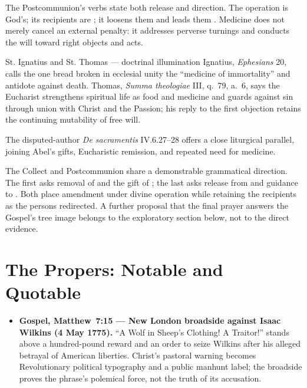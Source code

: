\begin{deepstudy}
The Postcommunion's verbs state both release and direction. The operation is God's; its recipients are ; it loosens them  and leads them . Medicine does not merely cancel an external penalty: it addresses perverse turnings and conducts the will toward right objects and acts.

\begin{sourcecard}{St. Ignatius and St. Thomas --- doctrinal illumination}
Ignatius, \emph{Ephesians} 20, calls the one bread broken in ecclesial unity the ``medicine of immortality'' and antidote against death. Thomas, \emph{Summa theologiae} III, q.~79, a.~6, says the Eucharist strengthens spiritual life as food and medicine and guards against sin through union with Christ and the Passion; his reply to the first objection retains the continuing mutability of free will.
\end{sourcecard}

The disputed-author \emph{De sacramentis} IV.6.27--28 offers a close liturgical parallel, joining Abel's gifts, Eucharistic remission, and repeated need for medicine.

The Collect and Postcommunion share a demonstrable grammatical direction. The first asks removal of  and the gift of ; the last asks release from  and guidance to . Both place amendment under divine operation while retaining the recipients as the persons redirected. A further proposal that the final prayer answers the Gospel's tree image belongs to the exploratory section below, not to the direct evidence.

\sectionguard
\section*{The Propers: Notable and Quotable}

{\small
\begin{itemize}[itemsep=0.35em,topsep=0.2em,parsep=0pt]
\item \textbf{Gospel, Matthew~7:15 --- New London broadside against Isaac Wilkins (4 May 1775).} ``A Wolf in Sheep's Clothing! A Traitor!'' stands above a hundred-pound reward and an order to seize Wilkins after his alleged betrayal of American liberties. Christ's pastoral warning becomes Revolutionary political typography and a public manhunt label; the broadside proves the phrase's polemical force, not the truth of its accusation.


\end{itemize}}
\end{deepstudy}
